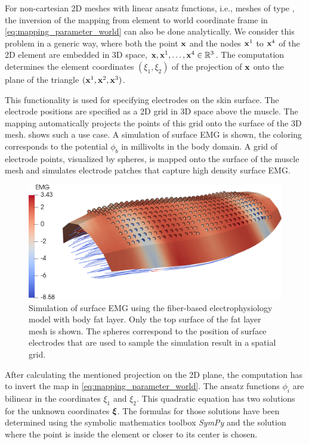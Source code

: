 For non-cartesian 2D meshes with linear ansatz functions, i.e., meshes of type , the inversion of the mapping from element to world coordinate frame in \cref{eq:mapping_parameter_world} can also be done analytically. We consider this problem in a generic way, where both the point $\textbf{x}$ and the nodes $\textbf{x}^1$ to $\textbf{x}^4$ of the 2D element are embedded in 3D space, $\textbf{x},\textbf{x}^1,\dots,\textbf{x}^4 \in \mathbb{R}^3$. The computation determines the element coordinates $(\xi_1,\xi_2)$ of the projection of $\textbf{x}$ onto the plane of the triangle $(\textbf{x}^1,\textbf{x}^2,\textbf{x}^3)$. 

This functionality is used for specifying electrodes on the skin surface. The electrode positions are specified as a 2D grid in 3D space above the muscle. The mapping automatically projects the points of this grid onto the surface of the 3D mesh.  shows such a use case. A simulation of surface EMG is shown, the coloring corresponds to the potential $\phi_b$ in millivolts in the body domain. A grid of electrode points, visualized by spheres, is mapped onto the surface of the muscle mesh and simulates electrode patches that capture high density surface EMG.

\begin{figure}%
  \centering%
  \includegraphics[width=\textwidth]{images/implementation/electrodes.png}%
  \caption{Simulation of surface EMG using the fiber-based electrophysiology model with body fat layer. Only the top surface of the fat layer mesh is shown. The spheres correspond to the position of surface electrodes that are used to sample the simulation result in a spatial grid.}%
  \label{fig:electrodes}%
\end{figure}%

After calculating the mentioned projection on the 2D plane, the computation has to invert the map in \cref{eq:mapping_parameter_world}. The ansatz functions $\phi_i$ are bilinear in the coordinates $\xi_1$ and $\xi_2$. This quadratic equation has two solutions for the unknown coordinates $\boldsymbol{\xi}$. The formulas for those solutions have been determined using the symbolic mathematics toolbox \emph{SymPy} \cite{meurer2017sympy} and the solution where the point is inside the element or closer to its center is chosen.


